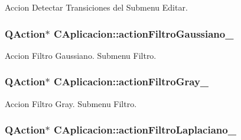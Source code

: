 Accion Detectar Transiciones del Submenu Editar. 

\subsubsection[{\texorpdfstring{action\+Filtro\+Gaussiano\+\_\+}{actionFiltroGaussiano_}}]{\setlength{\rightskip}{0pt plus 5cm}Q\+Action$\ast$ C\+Aplicacion\+::action\+Filtro\+Gaussiano\+\_\+\hspace{0.3cm}{\ttfamily [private]}}\hypertarget{classCAplicacion_ae6827414fe74e31b2216ec04f61ad21f}{}\label{classCAplicacion_ae6827414fe74e31b2216ec04f61ad21f}


Accion Filtro Gaussiano. Submenu Filtro. 

\subsubsection[{\texorpdfstring{action\+Filtro\+Gray\+\_\+}{actionFiltroGray_}}]{\setlength{\rightskip}{0pt plus 5cm}Q\+Action$\ast$ C\+Aplicacion\+::action\+Filtro\+Gray\+\_\+\hspace{0.3cm}{\ttfamily [private]}}\hypertarget{classCAplicacion_a62326cfe231c222d4d3411b4f9a5fc81}{}\label{classCAplicacion_a62326cfe231c222d4d3411b4f9a5fc81}


Accion Filtro Gray. Submenu Filtro. 

\subsubsection[{\texorpdfstring{action\+Filtro\+Laplaciano\+\_\+}{actionFiltroLaplaciano_}}]{\setlength{\rightskip}{0pt plus 5cm}Q\+Action$\ast$ C\+Aplicacion\+::action\+Filtro\+Laplaciano\+\_\+\hspace{0.3cm}{\ttfamily [private]}}\hypertarget{classCAplicacion_ad1cce3c330ee913f1129d19bba5f22f0}{}\label{classCAplicacion_ad1cce3c330ee913f1129d19bba5f22f0}


